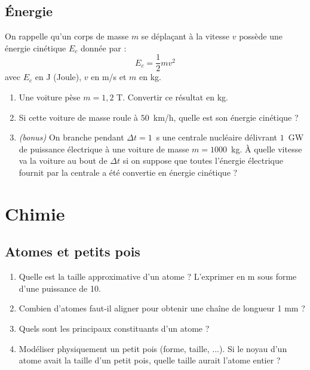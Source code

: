 \subsection{\'{E}nergie}
On rappelle qu’un corps de masse $m$ se déplaçant à la vitesse $v$ possède une énergie cinétique $E_c$ donnée par :
\begin{equation}
    E_c = \frac{1}{2}mv^2
\end{equation}
avec $E_c$ en J (Joule), $v$ en m/s et $m$ en kg.
\begin{enumerate}
    \item Une voiture pèse $m=1,2$ T. Convertir ce résultat en kg.
    \item Si cette voiture de masse roule à $50$~km/h, quelle est son énergie cinétique ?
    \item \textit{(bonus)} On branche pendant $\Delta t =1$~s une centrale nucléaire délivrant $1$~GW de puissance électrique à une voiture de masse $m=1000$~kg. \`{A} quelle vitesse va la voiture au bout de $\Delta t$ si on suppose que toutes l'énergie électrique fournit par la centrale a été convertie en énergie cinétique ?
\end{enumerate}

\section{Chimie}
\subsection{Atomes et petits pois}
\begin{enumerate}
    \item Quelle est la taille approximative d’un atome ? L’exprimer en m sous forme d’une puissance de 10.
    \item Combien d’atomes faut-il aligner pour obtenir une chaîne de longueur 1 mm ?
    \item Quels sont les principaux constituants d’un atome ?
    \item Modéliser physiquement un petit pois (forme, taille, ...). Si le noyau d’un atome avait la taille d’un petit pois, quelle taille aurait l’atome entier ?
\end{enumerate} 

